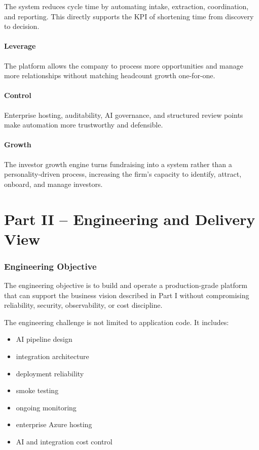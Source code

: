\documentclass[11pt]{article}
\begin{document}
The system reduces cycle time by automating intake, extraction, coordination, and reporting. This directly supports the KPI of shortening time from discovery to decision.

\subsection{Leverage}

The platform allows the company to process more opportunities and manage more relationships without matching headcount growth one-for-one.

\subsection{Control}

Enterprise hosting, auditability, AI governance, and structured review points make automation more trustworthy and defensible.

\subsection{Growth}

The investor growth engine turns fundraising into a system rather than a personality-driven process, increasing the firm's capacity to identify, attract, onboard, and manage investors.

\newpage
\part*{Part II -- Engineering and Delivery View}

\section{Engineering Objective}

The engineering objective is to build and operate a production-grade platform that can support the business vision described in Part I without compromising reliability, security, observability, or cost discipline.

The engineering challenge is not limited to application code. It includes:

\begin{itemize}
\item AI pipeline design
\item integration architecture
\item deployment reliability
\item smoke testing
\item ongoing monitoring
\item enterprise Azure hosting
\item AI and integration cost control
\end{itemize}
\end{document}
